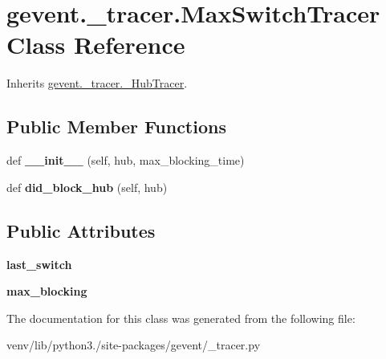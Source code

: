 \hypertarget{classgevent_1_1__tracer_1_1_max_switch_tracer}{}\section{gevent.\+\_\+tracer.\+Max\+Switch\+Tracer Class Reference}
\label{classgevent_1_1__tracer_1_1_max_switch_tracer}


Inherits \hyperlink{classgevent_1_1__tracer_1_1___hub_tracer}{gevent.\+\_\+tracer.\+\_\+\+Hub\+Tracer}.

\subsection*{Public Member Functions}
\begin{DoxyCompactItemize}
\item 
\mbox{\label{classgevent_1_1__tracer_1_1_max_switch_tracer_a2bc7232422dc80fa32db31ea4334fbbe}} 
def {\bfseries \+\_\+\+\_\+init\+\_\+\+\_\+} (self, hub, max\+\_\+blocking\+\_\+time)
\item 
\mbox{\label{classgevent_1_1__tracer_1_1_max_switch_tracer_a154901eeb63089478cdb31a8f09367a1}} 
def {\bfseries did\+\_\+block\+\_\+hub} (self, hub)
\end{DoxyCompactItemize}
\subsection*{Public Attributes}
\begin{DoxyCompactItemize}
\item 
\mbox{\label{classgevent_1_1__tracer_1_1_max_switch_tracer_ac5cb2a825622f6cd95c4da99df4e83f1}} 
{\bfseries last\+\_\+switch}
\item 
\mbox{\label{classgevent_1_1__tracer_1_1_max_switch_tracer_abd9db250c40c40ddebe45ad3a37e0810}} 
{\bfseries max\+\_\+blocking}
\end{DoxyCompactItemize}


The documentation for this class was generated from the following file\+:\begin{DoxyCompactItemize}
\item 
venv/lib/python3./site-\/packages/gevent/\+\_\+tracer.\+py\end{DoxyCompactItemize}
